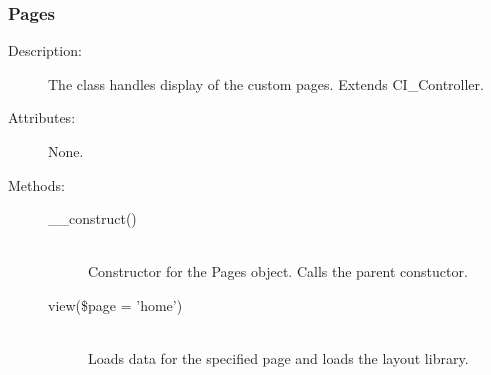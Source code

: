 \documentclass[11pt]{article} %
\begin{document}
\subsubsection{Pages}
\begin{description}
\item[Description:] The class handles display of the custom pages. Extends CI\_Controller.
\item[Attributes:] None.
\item[Methods:] \textbf{ }
\begin{description}
\item[\_\_construct()]  \textbf{ }\\
Constructor for the Pages object. Calls the parent constuctor.
\item[view(\$page = 'home')]  \textbf{ }\\
Loads data for the specified page and loads the layout library.
\end{description} 
\end{description} 
\end{document}
